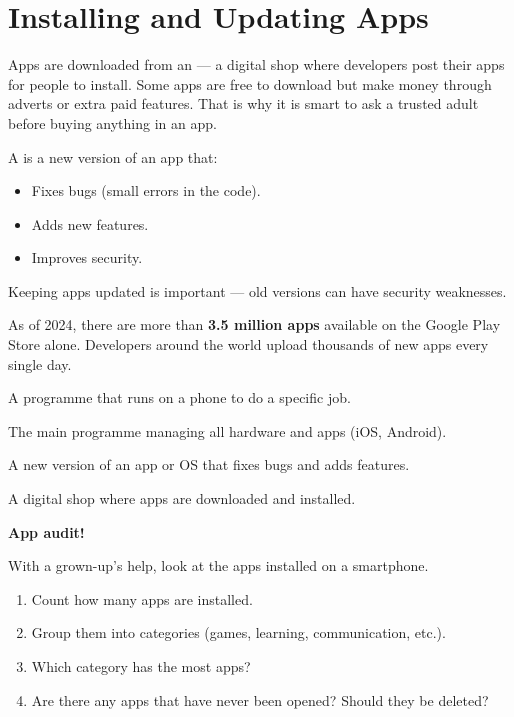 \sectionrule

\section*{Installing and Updating Apps}

Apps are downloaded from an  — a digital shop where developers
post their apps for people to install.
Some apps are free to download but make money through adverts or extra paid features.
That is why it is smart to ask a trusted adult before buying anything in an app.

A  is a new version of an app that:
\begin{itemize}
  \item Fixes bugs (small errors in the code).
  \item Adds new features.
  \item Improves security.
\end{itemize}

Keeping apps updated is important — old versions can have security weaknesses.

\begin{funfact}
  As of 2024, there are more than \textbf{3.5 million apps} available on
  the Google Play Store alone. Developers around the world upload
  thousands of new apps every single day.
\end{funfact}

\sectionrule

\begin{newwords}
  \begin{description}[labelwidth=4cm, leftmargin=4.2cm]
    \item[\term{App}]               A programme that runs on a phone to do a specific job.
    \item[\term{Operating system}]  The main programme managing all hardware and apps (iOS, Android).
    \item[\term{Update}]            A new version of an app or OS that fixes bugs and adds features.
    \item[\term{App store}]         A digital shop where apps are downloaded and installed.
  \end{description}
\end{newwords}

\sectionrule

\begin{tryit}
  \textbf{App audit!}

  With a grown-up's help, look at the apps installed on a smartphone.
  \begin{enumerate}[label=\textbf{\arabic*.}]
    \item Count how many apps are installed.
    \item Group them into categories (games, learning, communication, etc.).
    \item Which category has the most apps?
    \item Are there any apps that have never been opened? Should they be deleted?
  \end{enumerate}
\end{tryit}

